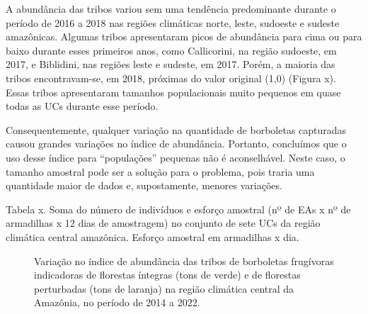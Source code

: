 \documentclass[
  letterpaper,
]{scrbook}
\begin{document}
A abundância das tribos variou sem uma tendência predominante durante o
período de 2016 a 2018 nas regiões climáticas norte, leste, sudoeste e
sudeste amazônicas. Algumas tribos apresentaram picos de abundância para
cima ou para baixo durante esses primeiros anos, como Callicorini, na
região sudoeste, em 2017, e Biblidini, nas regiões leste e sudeste, em
2017. Porém, a maioria das tribos encontravam-se, em 2018, próximas do
valor original (1,0) (Figura x). Essas tribos apresentaram tamanhos
populacionais muito pequenos em quase todas as UCs durante esse período.

Consequentemente, qualquer variação na quantidade de borboletas
capturadas causou grandes variações no índice de abundância. Portanto,
concluímos que o uso desse índice para ``populações'' pequenas não é
aconselhável. Neste caso, o tamanho amostral pode ser a solução para o
problema, pois traria uma quantidade maior de dados e, supostamente,
menores variações.

Tabela x. Soma do número de indivíduos e esforço amostral (nº de EAs x
nº de armadilhas x 12 dias de amostragem) no conjunto de sete UCs da
região climática central amazônica. Esforço amostral em armadilhas x
dia.

\begin{figure}[H]


\caption{\label{fig-IA-regiao-climatica-central-amazonica}Variação no
índice de abundância das tribos de borboletas frugívoras indicadoras de
florestas íntegras (tons de verde) e de florestas perturbadas (tons de
laranja) na região climática central da Amazônia, no período de 2014 a
2022.}

\end{figure}%
\end{document}
